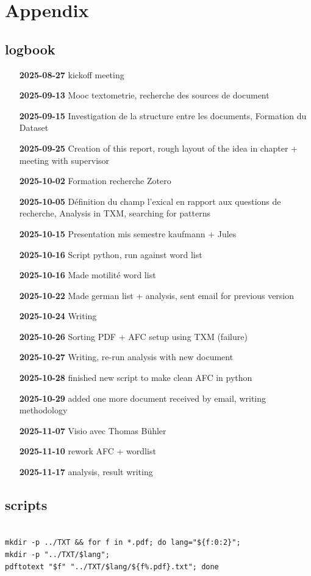 \section{Appendix}

\subsection{logbook}

\begin{itemize}[leftmargin=1.5cm,label={}]
    \item[\textbf{2025-08-27}] kickoff meeting
    \item[\textbf{2025-09-13}] Mooc textometrie, recherche des sources de document
    \item[\textbf{2025-09-15}] Investigation de la structure entre les documents, Formation du Dataset
    \item[\textbf{2025-09-25}] Creation of this report, rough layout of the idea in chapter + meeting with supervisor
    \item[\textbf{2025-10-02}] Formation recherche Zotero
    \item[\textbf{2025-10-05}] Définition du champ l'exical en rapport aux questions de recherche, Analysis in TXM, searching for patterns
    \item[\textbf{2025-10-15}] Presentation mis semestre kaufmann + Jules
    \item[\textbf{2025-10-16}] Script python, run against word list
    \item[\textbf{2025-10-16}] Made motilité word list
    \item[\textbf{2025-10-22}] Made german list + analysis, sent email for previous version
    \item[\textbf{2025-10-24}] Writing
    \item[\textbf{2025-10-26}] Sorting PDF + AFC setup using TXM (failure)
    \item[\textbf{2025-10-27}] Writing, re-run analysis with new document
    \item[\textbf{2025-10-28}] finished new script to make clean AFC in python
    \item[\textbf{2025-10-29}] added one more document received by email, writing methodology
    \item[\textbf{2025-11-07}] Visio avec Thomas Bühler
    \item[\textbf{2025-11-10}] rework AFC + wordlist
    \item[\textbf{2025-11-17}] analysis, result writing
\end{itemize}

\subsection{scripts}

\begin{lstlisting}[caption={Extract text content from PDFs by language}, label={lst:extract_pdfs}]

mkdir -p ../TXT && for f in *.pdf; do lang="${f:0:2}";
mkdir -p "../TXT/$lang";
pdftotext "$f" "../TXT/$lang/${f%.pdf}.txt"; done

\end{lstlisting}
